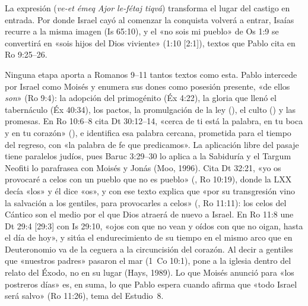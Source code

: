 La expresión  (\emph{ve-et émeq Ajor le-fétaj tiqvá}) transforma el lugar del castigo en entrada. Por donde Israel cayó al comenzar la conquista volverá a entrar, Isaías recurre a la misma imagen (Is 65:10), y el «no sois mi pueblo» de Os 1:9 se convertirá en «sois hijos del Dios viviente» (1:10 [2:1]), textos que Pablo cita en Ro 9:25–26.

Ninguna etapa aporta a Romanos 9–11 tantos textos como esta. Pablo intercede por Israel como Moisés y enumera sus dones como posesión presente, «de ellos \emph{son}» (Ro 9:4): la adopción del primogénito (Éx 4:22), la gloria que llenó el tabernáculo (Éx 40:34), los pactos, la promulgación de la ley (), el culto () y las promesas. En Ro 10:6–8 cita Dt 30:12–14, «cerca de ti está la palabra, en tu boca y en tu corazón» (), e identifica esa palabra cercana, prometida para el tiempo del regreso, con «la palabra de fe que predicamos». La aplicación libre del pasaje tiene paralelos judíos, pues Baruc 3:29–30 lo aplica a la Sabiduría y el Targum Neofiti lo parafrasea con Moisés y Jonás (Moo, 1996). Cita Dt 32:21, «yo os provocaré a celos con un pueblo que no es pueblo» (, Ro 10:19), donde la LXX decía «los» y él dice «os», y con ese texto explica que «por su transgresión vino la salvación a los gentiles, para provocarles a celos» (, Ro 11:11): los celos del Cántico son el medio por el que Dios atraerá de nuevo a Israel. En Ro 11:8 une Dt 29:4 [29:3] con Is 29:10, «ojos con que no vean y oídos con que no oigan, hasta el día de hoy», y sitúa el endurecimiento de su tiempo en el mismo arco que en Deuteronomio va de la ceguera a la circuncisión del corazón. Al decir a gentiles que «nuestros padres» pasaron el mar (1~Co 10:1), pone a la iglesia dentro del relato del Éxodo, no en su lugar (Hays, 1989). Lo que Moisés anunció para «los postreros días» es, en suma, lo que Pablo espera cuando afirma que «todo Israel será salvo» (Ro 11:26), tema del Estudio~8.

